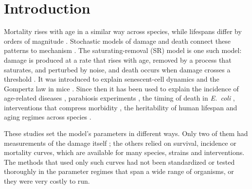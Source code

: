 \section{Introduction}\label{sec:intro}

Mortality rises with age in a similar way across species, while lifespans differ by orders of magnitude
\citep{jones2014diversity,raz2026damage}. Stochastic models of damage and death connect these patterns to
mechanism \citep{strehler1960general,sacher1962stochastic,ledberg2020exponential,fedichev2025minimal}. The
saturating-removal (SR) model is one such model: damage is produced at a rate that rises with age, removed by a
process that saturates, and perturbed by noise, and death occurs when damage crosses a threshold
\citep{karin2019senescent}. It was introduced to explain senescent-cell dynamics and the Gompertz law in mice
\citep{karin2019senescent}. Since then it has been used to explain the incidence of age-related diseases
\citep{katzir2021senescent}, parabiosis experiments \citep{karin2021parabiosis}, the timing of death in
\emph{E.~coli} \citep{yang2023damage}, interventions that compress morbidity
\citep{yang2025compression}, the heritability of human lifespan \citep{shenhar2026heritability} and aging regimes
across species \citep{raz2026damage}.

These studies set the model's parameters in different ways. Only two of them had measurements of the damage itself
\citep{karin2019senescent,yang2023damage}; the others relied on survival, incidence or mortality curves, which are
available for many species, strains and interventions. The methods that used only such curves had not been
standardized or tested thoroughly in the parameter regimes that span a wide range of organisms, or they were very
costly to run.

